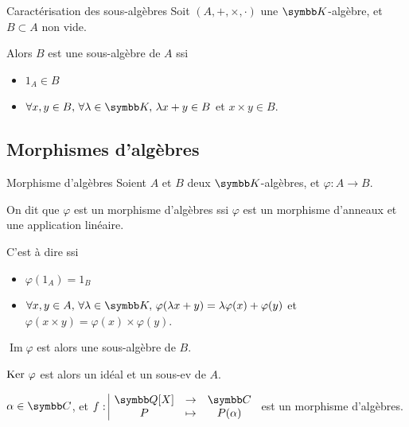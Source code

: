 \begin{proposition}{Caractérisation des sous-algèbres}{}
    Soit $(A, +, \times, \cdot)$ une $\K$-algèbre, et $B \subset A$ non vide. 

    Alors $B$ est une sous-algèbre de $A$ ssi 
    \begin{itemize}
        \item $1_A \in B$
        \item $\forall x, y \in B, \, \forall \lambda \in \K, \, \lambda x + y \in B$ et $x \times y \in B$.
    \end{itemize}
\end{proposition}

\subsection{Morphismes d'algèbres}

\begin{definition}{Morphisme d'algèbres}{}
    Soient $A$ et $B$ deux $\K$-algèbres, et $\varphi : A \to B$.

    On dit que $\varphi$ est un morphisme d'algèbres ssi $\varphi$ est un 
    morphisme d'anneaux et une application linéaire.

    C'est à dire ssi 
    \begin{itemize}
        \item $\varphi(1_A) = 1_B$
        \item $\forall x, y \in A, \, \forall \lambda \in \K, \, \varphi(\lambda x + y) = \lambda \varphi(x) + \varphi(y)$
        et $\varphi(x \times y) = \varphi(x) \times \varphi(y)$.
    \end{itemize}
\end{definition}

\begin{remarque}
    $\operatorname{Im} \varphi$ est alors une sous-algèbre de $B$.

    $\operatorname{Ker} \, \varphi$ est alors un idéal et un sous-ev de $A$.
\end{remarque}

\begin{exemple}
    $\alpha \in \C$, et $\fonction f {\Q[X]} \C P {P(\alpha)}$ est un morphisme d'algèbres.
\end{exemple}
